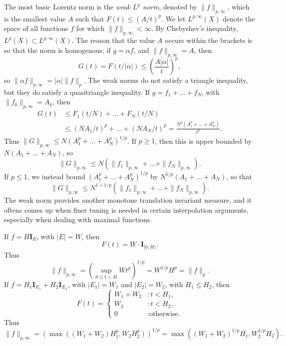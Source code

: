 The most basic Lorentz norm is the \emph{weak $L^p$ norm}, denoted by $\| f \|_{p,\infty}$, which is the smallest value $A$ such that $F(t) \leq (A/t)^p$. We let $L^{p,\infty}(X)$ denote the space of all functions $f$ for which $\| f \|_{p,\infty} < \infty$. By Chebyshev's inequality, $L^p(X) \subset L^{p,\infty}(X)$. The reason that the value $A$ occurs within the brackets is so that the norm is homogenous; if $g = \alpha f$, and $\| f \|_{p,\infty} = A$, then
%
\[ G(t) = F(t/|\alpha|) \leq \left( \frac{A |\alpha|}{t} \right)^p, \]
%
so $\| \alpha f \|_{p,\infty} = |\alpha| \| f \|_p$. The weak norms do not satisfy a triangle inequality, but they do satisfy a quasitriangle inequality. If $g = f_1 + \dots + f_N$, with $\| f_k \|_{p,\infty} = A_k$, then
%
\begin{align*}
    G(t) &\leq F_1(t/N) + \dots + F_N(t/N)\\
    &\leq (NA_1/t)^p + \dots + (NA_N/t)^p = \frac{N^p(A_1^p + \dots + A_N^p)}{t^p}.
\end{align*}
%
Thus $\| G \|_{p,\infty} \leq N(A_1^p + \dots + A_N^p)^{1/p}$. If $p \geq 1$, then this is upper bounded by $N(A_1 + \dots + A_N)$, so
%
\[ \| G \|_{p,\infty} \leq N \left( \| f_1 \|_{p,\infty} + \dots + \| f_N \|_{p,\infty} \right). \]
%
If $p \leq 1$, we instead bound $(A_1^p + \dots + A_N^p)^{1/p}$ by $N^{1/p}(A_1 + \dots + A_N)$, so that
%
\[ \| G \|_{p,\infty} \leq N^{1 + 1/p} \left( \| f_1 \|_{p,\infty} + \dots + \| f_N \|_{p,\infty} \right). \]
%
The weak norm provides another monotone translation invariant measure, and it oftens comes up when finer tuning is needed in certain interpolation arguments, especially when dealing with maximal functions.

\begin{example}
  If $f = H \mathbf{I}_E$, with $|E| = W$, then
  \[ F(t) = W \cdot \mathbf{I}_{[0,H)}. \]
  Thus
  \[ \| f \|_{p,\infty} = \left( \sup_{0 \leq t < H} W t^p \right)^{1/p} = W^{1/p} H^p = \| f \|_p. \]
  If $f = H_1 \mathbf{I}_{E_1} + H_2 \mathbf{I}_{E_2}$, with $|E_1| = W_1$ and $|E_2| = W_2$, with $H_1 \leq H_2$, then
  \[ F(t) = \begin{cases} W_1 + W_2 &: t < H_1, \\ W_2 &: t < H_2, \\ 0 &: \text{otherwise.} \end{cases} \]
  Thus
  \[ \| f \|_{p,\infty} = \left( \max((W_1 + W_2) H_1^p, W_2 H_2^p) \right)^{1/p} = \max((W_1 + W_2)^{1/p} H_1, W_2^{1/p} H_2). \]
\end{example}

